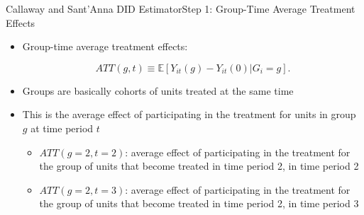 \documentclass[dvipsnames,hyperref={pdfpagelabels=false}]{beamer}
\begin{document}
\begin{frame}{Callaway and Sant'Anna DID Estimator}{Step 1: Group-Time Average Treatment Effects}
	\begin{itemize}
		\item Group-time average treatment effects:
		
		\begin{equation*}
	    ATT (g,t) \equiv \mathbb{E}\left[Y_{it}(g)-Y_{it}(0) | G_{i}=g \right].
		\end{equation*}
		
		
		\item Groups are basically cohorts of units treated at the same time
						\vspace{0.2cm}
		\item This is the average effect of participating in the treatment for units in group $g$ at time period $t$
				\vspace{0.2cm}
			\begin{itemize}
		\item $ATT(g=2,t=2)$: average effect of participating in the treatment for the group of units that become treated in time period 2, in time period 2
						\vspace{0.2cm}
		\item $ATT(g=2,t=3)$: average effect of participating in the treatment for the group of units that become treated in time period 2, in time period 3
		
		
			\end{itemize}
		
		
	\end{itemize}
	
	
\end{frame}
\end{document}
